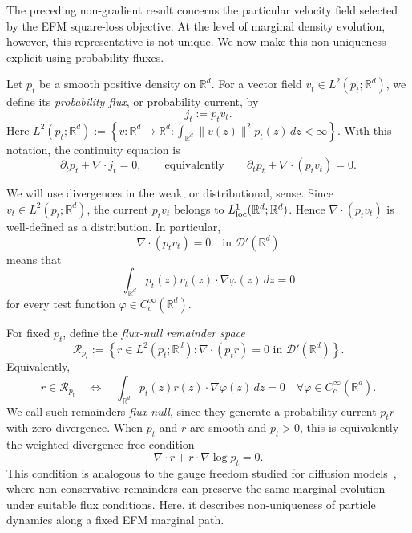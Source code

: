 \documentclass[a4paper,11pt]{article}
\newcommand{\R}{\mathbb{R}}
\theoremstyle{plain}
\theoremstyle{definition}
\begin{document}
The preceding non-gradient result concerns the particular velocity field selected by the EFM square-loss objective. At the level of marginal density evolution, however, this representative is not unique. We now make this non-uniqueness explicit using probability fluxes. 

Let \(p_t\) be a smooth positive density on \(\R^d\). For a vector field
\(v_t\in L^2(p_t;\R^d)\), we define its \emph{probability flux}, or
probability current, by
\[
    j_t := p_t v_t .
\]
Here
\(
    L^2(p_t;\R^d)
    :=
    \left\{
    v:\R^d\to\R^d:
    \int_{\R^d}\|v(z)\|^2p_t(z)\,dz<\infty
    \right\}.
\)
With this notation, the continuity equation is
\[
    \partial_t p_t+\nabla\cdot j_t=0,
    \qquad\text{equivalently}\qquad
    \partial_t p_t+\nabla\cdot(p_t v_t)=0.
\]

We will use divergences in the weak, or distributional, sense. Since
\(v_t\in L^2(p_t;\R^d)\), the current \(p_t v_t\) belongs to
\(L^1_{\rm loc}(\R^d;\R^d)\). Hence \(\nabla\cdot(p_t v_t)\) is
well-defined as a distribution. In particular,
\[
    \nabla\cdot(p_t v_t)=0
    \quad\text{in }\mathcal D'(\R^d)
\]
means that
\[
    \int_{\R^d} p_t(z)v_t(z)\cdot\nabla\varphi(z)\,dz=0
\]
for every test function \(\varphi\in C_c^\infty(\R^d)\).

For fixed \(p_t\), define the \emph{flux-null remainder space}
\[
    \mathcal R_{p_t}
    :=
    \left\{
    r\in L^2(p_t;\R^d):
    \nabla\cdot(p_t r)=0
    \text{ in }\mathcal D'(\R^d)
    \right\}.
\]
Equivalently,
\[
    r\in\mathcal R_{p_t}
    \quad\Longleftrightarrow\quad
    \int_{\R^d}p_t(z)r(z)\cdot\nabla\varphi(z)\,dz=0
    \quad
    \forall \varphi\in C_c^\infty(\R^d).
\]
We call such remainders \emph{flux-null}, since they generate a probability
current \(p_t r\) with zero divergence. When \(p_t\) and \(r\) are smooth and
\(p_t>0\), this is equivalently the weighted divergence-free condition
\[
    \nabla\cdot r+r\cdot\nabla\log p_t=0.
\]
This condition is analogous to the gauge freedom studied for diffusion models~\cite{horvat2024gauge}, where non-conservative remainders can preserve the same marginal evolution under suitable flux conditions. Here, it describes non-uniqueness of particle
dynamics along a fixed EFM marginal path.
\end{document}

